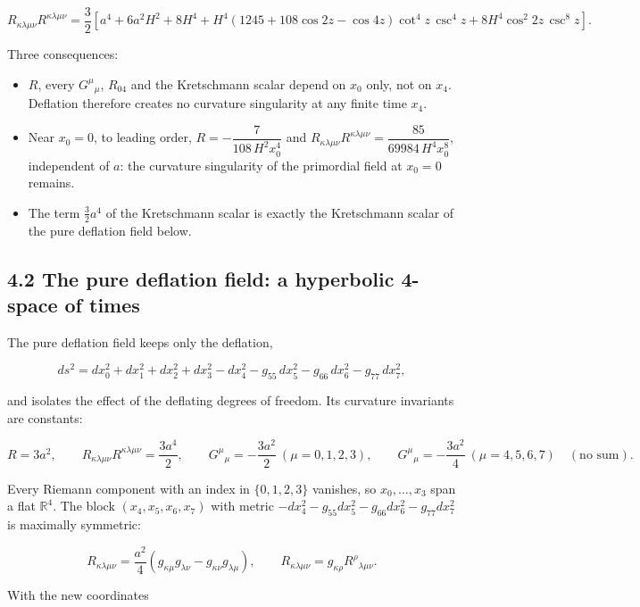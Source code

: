 \documentclass[10pt]{article}
\makeatletter
\newcommand\keepnext{\par\nopagebreak\@nobreaktrue\everypar{\@nobreakfalse\everypar{}}}
\makeatother
\begin{document}
\[
R_{\kappa\lambda\mu\nu}R^{\kappa\lambda\mu\nu} = \frac32\left[a^4 + 6a^2H^2 + 8H^4 + H^4\left(1245 + 108\cos 2z - \cos 4z\right)\cot^4 z\,\csc^4 z + 8H^4\cos^2 2z\,\csc^8 z\right].
\]

Three consequences:\keepnext


\begin{itemize}
\item $R$, every $G^\mu{}_\mu$, $R_{04}$ and the Kretschmann scalar depend on $x_0$ only, not on $x_4$. Deflation therefore creates no curvature singularity at any finite time $x_4$.
\item Near $x_0 = 0$, to leading order, $R = -\dfrac{7}{108\,H^2x_0^4}$ and $R_{\kappa\lambda\mu\nu}R^{\kappa\lambda\mu\nu} = \dfrac{85}{69984\,H^4x_0^8}$, independent of $a$: the curvature singularity of the primordial field at $x_0 = 0$ remains.
\item The term $\frac32a^4$ of the Kretschmann scalar is exactly the Kretschmann scalar of the pure deflation field below.
\end{itemize}

\subsection*{4.2 The pure deflation field: a hyperbolic 4-space of times}

The pure deflation field keeps only the deflation,\keepnext


\[
ds^2 = dx_0^2 + dx_1^2 + dx_2^2 + dx_3^2 - dx_4^2 - g_{55}\,dx_5^2 - g_{66}\,dx_6^2 - g_{77}\,dx_7^2 ,
\]

and isolates the effect of the deflating degrees of freedom. Its curvature invariants are constants:\keepnext


\[
R = 3a^2, \qquad R_{\kappa\lambda\mu\nu}R^{\kappa\lambda\mu\nu} = \frac{3a^4}{2}, \qquad G^\mu{}_\mu = -\frac{3a^2}{2}\ (\mu = 0, 1, 2, 3), \qquad G^\mu{}_\mu = -\frac{3a^2}{4}\ (\mu = 4, 5, 6, 7) \quad (\text{no sum}).
\]

Every Riemann component with an index in $\{0, 1, 2, 3\}$ vanishes, so $x_0, \dots, x_3$ span a flat $\mathbb R^4$. The block $(x_4, x_5, x_6, x_7)$ with metric $-dx_4^2 - g_{55}dx_5^2 - g_{66}dx_6^2 - g_{77}dx_7^2$ is maximally symmetric:\keepnext


\[
R_{\kappa\lambda\mu\nu} = \frac{a^2}{4}\left(g_{\kappa\mu}g_{\lambda\nu} - g_{\kappa\nu}g_{\lambda\mu}\right), \qquad R_{\kappa\lambda\mu\nu} = g_{\kappa\rho}R^\rho{}_{\lambda\mu\nu} .
\]

With the new coordinates\keepnext
\end{document}
